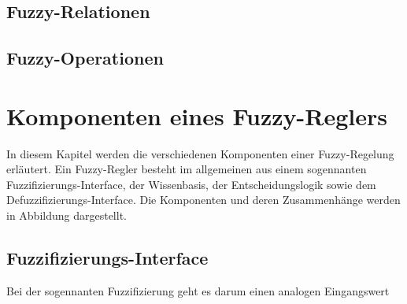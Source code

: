 \documentclass[12pt,a4paper,bibliography=totocnumbered,listof=totocnumbered]{scrartcl}
\begin{document}
\subsection{Fuzzy-Relationen}

\subsection{Fuzzy-Operationen}

\section{Komponenten eines Fuzzy-Reglers}

In diesem Kapitel werden die verschiedenen Komponenten einer Fuzzy-Regelung erläutert. Ein Fuzzy-Regler besteht im allgemeinen aus einem sogennanten Fuzzifizierungs-Interface, der Wissenbasis, der Entscheidungslogik sowie dem Defuzzifizierungs-Interface. Die Komponenten und deren Zusammenhänge werden in Abbildung dargestellt.


\subsection{Fuzzifizierungs-Interface}

Bei der sogennanten Fuzzifizierung geht es darum einen analogen Eingangswert 


\end{document}
